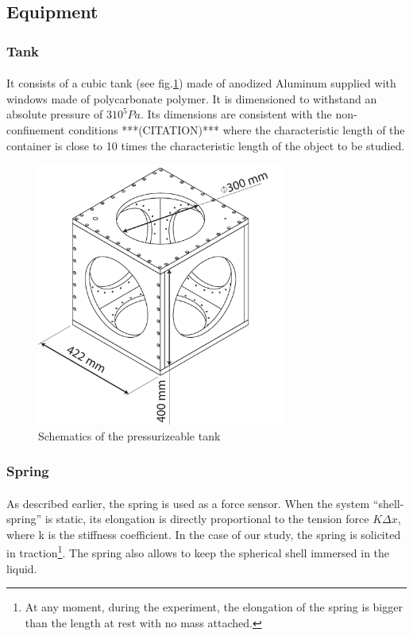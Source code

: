 \subsection{Equipment}
\subsubsection{Tank}
\paragraph{}
It consists of a cubic tank (see fig.\ref{fig:tank}) made of anodized Aluminum supplied with windows made of polycarbonate polymer. It is dimensioned to withstand an absolute pressure of $3 10^5 Pa$. Its dimensions are consistent with the non-confinement conditions ***(CITATION)*** where the characteristic length of the container is close to 10 times the characteristic length of the object to be studied.
\begin{figure}[H] %
	\centering%
  \includegraphics[width=0.73\textwidth]{figures/Chapter_1/cuve.pdf}
	\caption{Schematics of the pressurizeable tank}
	\label{fig:tank}
\end{figure}
\subsubsection{Spring}
\paragraph{}
As described earlier, the spring is used as a force sensor. 
When the system "`shell-spring"' is static, its elongation is directly proportional to the tension force $K \Delta x$, where k is the stiffness coefficient. In the case of our study, the spring is solicited in traction\footnote{At any moment, during the experiment, the elongation of the spring is bigger than the length at rest with no mass attached.}. 
The spring also allows to keep the spherical shell immersed in the liquid.

